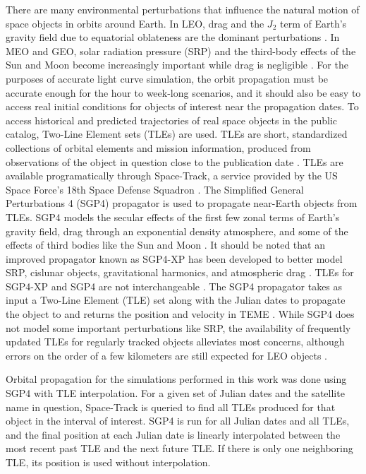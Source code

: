 There are many environmental perturbations that influence the natural motion of space objects in orbits around Earth. In LEO, drag and the $J_2$ term of Earth's gravity field due to equatorial oblateness are the dominant perturbations \cite{frueh2019notes}. In MEO and GEO, solar radiation pressure (SRP) and the third-body effects of the Sun and Moon become increasingly important while drag is negligible \cite{frueh2019notes}. For the purposes of accurate light curve simulation, the orbit propagation must be accurate enough for the hour to week-long scenarios, and it should also be easy to access real initial conditions for objects of interest near the propagation dates. To access historical and predicted trajectories of real space objects in the public catalog, Two-Line Element sets (TLEs) are used. TLEs are short, standardized collections of orbital elements and mission information, produced from observations of the object in question close to the publication date \cite{vallado4ed}. TLEs are available programatically through Space-Track, a service provided by the US Space Force's 18th Space Defense Squadron \cite{spacetrack}. The Simplified General Perturbations 4 (SGP4) propagator is used to propagate near-Earth objects from TLEs. SGP4 models the secular effects of the first few zonal terms of Earth's gravity field, drag through an exponential density atmosphere, and some of the effects of third bodies like the Sun and Moon \cite{vallado4ed}. It should be noted that an improved propagator known as SGP4-XP has been developed to better model SRP, cislunar objects, gravitational harmonics, and atmospheric drag \cite{payne2022}. TLEs for SGP4-XP and SGP4 are not interchangeable \cite{payne2022}. The SGP4 propagator takes as input a Two-Line Element (TLE) set along with the Julian dates to propagate the object to and returns the position and velocity in TEME \cite{vallado4ed}. While SGP4 does not model some important perturbations like SRP, the availability of frequently updated TLEs for regularly tracked objects alleviates most concerns, although errors on the order of a few kilometers are still expected for LEO objects \cite{vallado4ed}. 

Orbital propagation for the simulations performed in this work was done using SGP4 with TLE interpolation. For a given set of Julian dates and the satellite name in question, Space-Track is queried to find all TLEs produced for that object in the interval of interest. SGP4 is run for all Julian dates and all TLEs, and the final position at each Julian date is linearly interpolated between the most recent past TLE and the next future TLE. If there is only one neighboring TLE, its position is used without interpolation.

